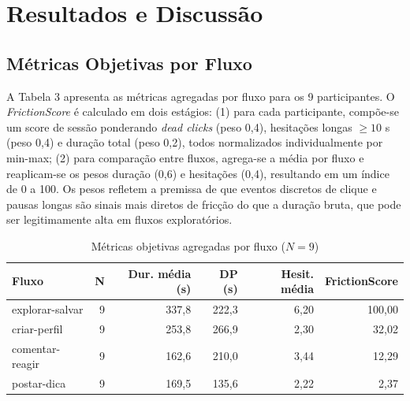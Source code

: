 \documentclass[12pt]{article}
\begin{document}
\section{Resultados e Discussão}

\subsection{Métricas Objetivas por Fluxo}

A Tabela 3 apresenta as métricas agregadas por fluxo para os 9 participantes. O \textit{FrictionScore} é calculado em dois estágios: (1) para cada participante, compõe-se um score de sessão ponderando \textit{dead clicks} (peso 0,4), hesitações longas $\geq 10$ s (peso 0,4) e duração total (peso 0,2), todos normalizados individualmente por min-max; (2) para comparação entre fluxos, agrega-se a média por fluxo e reaplicam-se os pesos duração (0,6) e hesitações (0,4), resultando em um índice de 0 a 100. Os pesos refletem a premissa de que eventos discretos de clique e pausas longas são sinais mais diretos de fricção do que a duração bruta, que pode ser legitimamente alta em fluxos exploratórios.

\begin{table}[htbp]
  \centering
  \caption{Métricas objetivas agregadas por fluxo ($N = 9$)}
  \begin{tabular}{p{3.2cm} r r r r r}
    \toprule
    \textbf{Fluxo} & \textbf{N} & \textbf{Dur. média (s)} & \textbf{DP (s)} & \textbf{Hesit. média} & \textbf{FrictionScore} \\
    \midrule
    explorar-salvar  & 9 & 337,8 & 222,3 & 6,20 & 100,00 \\
    criar-perfil     & 9 & 253,8 & 266,9 & 2,30 &  32,02 \\
    comentar-reagir  & 9 & 162,6 & 210,0 & 3,44 &  12,29 \\
    postar-dica      & 9 & 169,5 & 135,6 & 2,22 &   2,37 \\
    \bottomrule
  \end{tabular}
\end{table}
\end{document}

